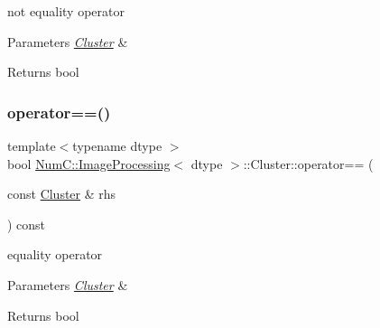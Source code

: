 not equality operator


\begin{DoxyParams}{Parameters}
{\em \mbox{\hyperlink{class_num_c_1_1_image_processing_1_1_cluster}{Cluster}}} & \\
\hline
\end{DoxyParams}
\begin{DoxyReturn}{Returns}
bool 
\end{DoxyReturn}
\mbox{\label{class_num_c_1_1_image_processing_1_1_cluster_acaac2e9dd8ace9ccc1f84238d58fcaa8}} 
\subsubsection{\texorpdfstring{operator==()}{operator==()}}
{\footnotesize\ttfamily template$<$typename dtype $>$ \\
bool \mbox{\hyperlink{class_num_c_1_1_image_processing}{Num\+C\+::\+Image\+Processing}}$<$ dtype $>$\+::Cluster\+::operator== (\begin{DoxyParamCaption}\item[{const \mbox{\hyperlink{class_num_c_1_1_image_processing_1_1_cluster}{Cluster}} \&}]{rhs }\end{DoxyParamCaption}) const\hspace{0.3cm}{\ttfamily [inline]}}

equality operator


\begin{DoxyParams}{Parameters}
{\em \mbox{\hyperlink{class_num_c_1_1_image_processing_1_1_cluster}{Cluster}}} & \\
\hline
\end{DoxyParams}
\begin{DoxyReturn}{Returns}
bool 
\end{DoxyReturn}
\mbox{\label{class_num_c_1_1_image_processing_1_1_cluster_a617555bb5a4a74b8e8c8327051275fd2}} 

